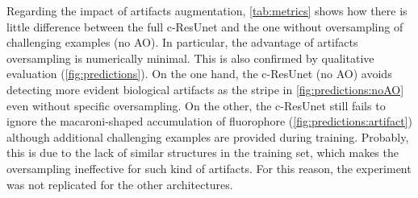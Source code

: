 Regarding the impact of artifacts augmentation, \cref{tab:metrics} shows how there is little difference between the full c-ResUnet and the one without oversampling of challenging examples (no AO).
In particular, the advantage of artifacts oversampling is numerically minimal.
This is also confirmed by qualitative evaluation (\cref{fig:predictions}).
On the one hand, the c-ResUnet (no AO) avoids detecting more evident biological artifacts as the stripe  in \cref{fig:predictions:noAO} even without specific oversampling.
On the other, the c-ResUnet  still fails to ignore the macaroni-shaped accumulation of fluorophore (\cref{fig:predictions:artifact}) although additional challenging examples are provided during training.
Probably, this is due to the lack of similar structures in the training set, which makes the oversampling ineffective for such kind of artifacts.
For this reason, the experiment was not replicated for the other architectures. 

